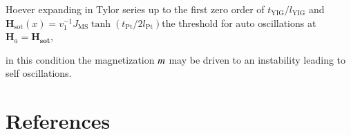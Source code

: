 \documentclass[twocolumn, final]{elsarticle}
\begin{document}
 Hoever expanding in Tylor series up to the first zero order of $t_{\mathrm{\scriptstyle{YIG}}}/l_{\mathrm{\scriptstyle{YIG}}}$  and  $\mathbf{H}_{\mathrm{\scriptstyle{sot}}}(x) =v_1^{-1} 
 J_{\mathrm{\scriptstyle{MS}}}\tanh(t_{\mathrm{\scriptstyle{Pt}}}/2 l_{\mathrm{\scriptstyle{Pt}}}) $the threshold for 
 auto oscillations at  $\mathbf{H}_{a}=\mathbf{H}_{\mathbf{\scriptstyle{sot}}}$, 
 
in this condition the magnetization $\boldmath{m}$  may be driven to an instability leading to self oscillations.  

\section*{References}


\end{document}
